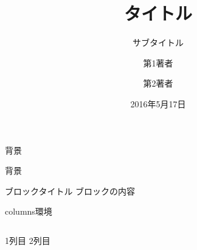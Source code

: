 \documentclass[10pt]{beamer}
\title{タイトル}
\subtitle{サブタイトル}
\author{第1著者\inst{1} \and 第2著者\inst{2}}
\institute[The Univ. of Shiga Pref.] %
{
  \inst{1}
  第1著者所属 \\
  第1著者所属部局
  \and
  \inst{2}
  第2著者所属 \\
  第2著者所属部局
}
\date{2016年5月17日}
\begin{document}
\begin{frame}
  \titlepage
\end{frame}


\begin{frame}{背景}
  
\end{frame}


\begin{frame}{背景}
  
  \begin{block}{ブロックタイトル}
    ブロックの内容
  \end{block}
\end{frame}



\begin{frame}{columns環境}
  \begin{columns}
    1列目
    2列目
  \end{columns}
    
\end{frame}
\end{document}
